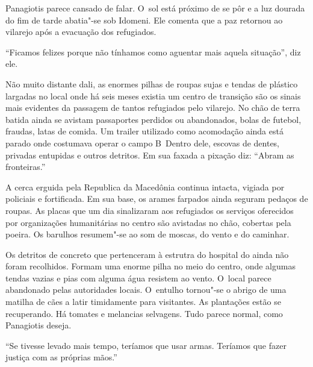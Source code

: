 Panagiotis parece cansado de falar. O~sol está próximo de se pôr e a luz
dourada do fim de tarde abatia"-se sob Idomeni. Ele comenta que a paz
retornou ao vilarejo após a evacuação dos refugiados.

``Ficamos felizes porque não tínhamos como aguentar mais aquela
situação'', diz ele.

Não muito distante dali, as enormes pilhas de roupas sujas e tendas de
plástico largadas no local onde há seis meses existia um centro de
transição são os sinais mais evidentes da passagem de tantos refugiados
pelo vilarejo. No chão de terra batida ainda se avistam passaportes
perdidos ou abandonados, bolas de futebol, fraudas, latas de comida. Um
trailer utilizado como acomodação ainda está parado onde costumava
operar o campo B\, Dentro dele, escovas de dentes, privadas entupidas e
outros detritos. Em sua faxada a pixação diz: ``Abram as fronteiras.''

A cerca erguida pela Republica da Macedônia continua intacta, vigiada
por policiais e fortificada. Em sua base, os arames farpados ainda
seguram pedaços de roupas. As placas que um dia sinalizaram aos
refugiados os serviços oferecidos por organizações humanitárias no
centro são avistadas no chão, cobertas pela poeira. Os barulhos
resumem"-se ao som de moscas, do vento e do caminhar.

Os detritos de concreto que pertenceram à estrutra do hospital do 
ainda não foram recolhidos. Formam uma enorme pilha no meio do centro,
onde algumas tendas vazias e pias com alguma água resistem ao vento. O~local parece abandonado pelas autoridades locais. O~entulho tornou"-se o
abrigo de uma matilha de cães a latir timidamente para visitantes. As
plantações estão se recuperando. Há tomates e melancias selvagens. Tudo
parece normal, como Panagiotis deseja.

``Se tivesse levado mais tempo, teríamos que usar armas. Teríamos que
fazer justiça com as próprias mãos.''


